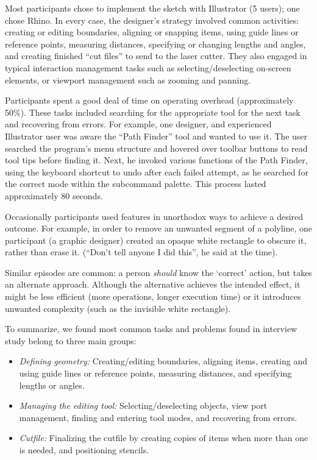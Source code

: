 \documentclass{article}
\begin{document}
Most participants chose to implement the sketch with Illustrator (5
users); one chose Rhino. In every case, the designer's strategy
involved common activities: creating or editing boundaries, aligning
or snapping items, using guide lines or reference points, measuring
distances, specifying or changing lengths and angles, and creating
finished ``cut files'' to send to the laser cutter.  They also engaged
in typical interaction management tasks such as selecting/deselecting
on-screen elements, or viewport management such as zooming and
panning.

Participants spent a good deal of time on operating overhead
(approximately 50\%). These tasks included searching for the
appropriate tool for the next task and recovering from errors. For
example, one designer, and experienced Illustrator user was aware the
``Path Finder'' tool and wanted to use it. The user searched the
program's menu structure and hovered over toolbar buttons to read tool
tips before finding it. Next, he invoked various functions of the Path
Finder, using the keyboard shortcut to undo after each failed attempt,
as he searched for the correct mode within the subcommand
palette. This process lasted approximately 80 seconds.

Occasionally participants used features in unorthodox ways to achieve
a desired outcome. For example, in order to remove an unwanted segment
of a polyline, one participant (a graphic designer) created an opaque
white rectangle to obscure it, rather than erase it. (``Don't tell
anyone I did this'', he said at the time).

Similar episodes are common: a person \textit{should} know the
`correct' action, but takes an alternate approach. Although the
alternative achieves the intended effect, it might be less efficient
(more operations, longer execution time) or it introduces unwanted
complexity (such as the invisible white rectangle).

To summarize, we found most common tasks and problems found in
interview study belong to three main groups:

\begin{itemize}
\item \textit{Defining geometry:} Creating/editing boundaries,
  aligning items, creating and using guide lines or reference points,
  measuring distances, and specifying lengths or angles.
\item \textit{Managing the editing tool:} Selecting/deselecting
  objects, view port management, finding and entering tool modes, and
  recovering from errors.
\item \textit{Cutfile:} Finalizing the cutfile by creating copies of
  items when more than one is needed, and positioning stencils.
\end{itemize}
\end{document}

